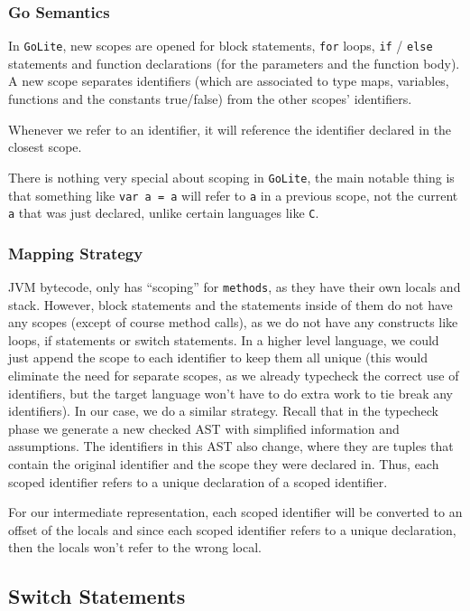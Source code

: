 \documentclass[11pt]{article}
\begin{document}
\subsubsection{Go Semantics}
\label{sec:orga3f36b0}
In \texttt{GoLite}, new scopes are opened for block statements, \texttt{for}
loops, \texttt{if} / \texttt{else} statements and function declarations (for the
parameters and the function body). A new scope separates
identifiers (which are associated to type maps, variables,
functions and the constants true/false) from the other scopes'
identifiers.

Whenever we refer to an identifier, it will reference the
identifier declared in the closest scope.

There is nothing very special about scoping in \texttt{GoLite}, the main
notable thing is that something like \texttt{var a = a} will refer to \texttt{a}
in a previous scope, not the current \texttt{a} that was just declared,
unlike certain languages like \texttt{C}.
\subsubsection{Mapping Strategy}
\label{sec:orgefbc543}
JVM bytecode, only has ``scoping'' for \texttt{methods}, as they have
their own locals and stack. However, block statements and the
statements inside of them do not have any scopes (except of course
method calls), as we do not have any constructs like loops, if
statements or switch statements. In a higher level language, we
could just append the scope to each identifier to keep them all
unique (this would eliminate the need for separate scopes, as we
already typecheck the correct use of identifiers, but the target
language won't have to do extra work to tie break any
identifiers). In our case, we do a similar strategy. Recall that
in the typecheck phase we generate a new checked AST with
simplified information and assumptions. The identifiers in this
AST also change, where they are tuples that contain the original
identifier and the scope they were declared in. Thus, each scoped
identifier refers to a unique declaration of a scoped identifier.

For our intermediate representation, each scoped identifier will
be converted to an offset of the locals and since each scoped
identifier refers to a unique declaration, then the locals won't
refer to the wrong local.
\subsection{Switch Statements}
\label{sec:orgc260707}
\end{document}
